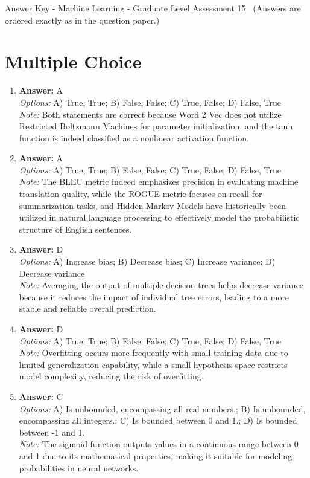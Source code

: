 \documentclass[12pt]{article}
\begin{document}
\begin{center}
Answer Key - Machine Learning - Graduate Level Assessment 15 \
\small (Answers are ordered exactly as in the question paper.)
\end{center}

\section*{Multiple Choice}
\begin{enumerate}[label=\arabic*.]
\item \textbf{Answer:} A
\\ \textit{Options:} A) True, True; B) False, False; C) True, False; D) False, True
\\ \textit{Note:} Both statements are correct because Word 2 Vec does not utilize Restricted Boltzmann Machines for parameter initialization, and the tanh function is indeed classified as a nonlinear activation function.
\item \textbf{Answer:} A
\\ \textit{Options:} A) True, True; B) False, False; C) True, False; D) False, True
\\ \textit{Note:} The BLEU metric indeed emphasizes precision in evaluating machine translation quality, while the ROGUE metric focuses on recall for summarization tasks, and Hidden Markov Models have historically been utilized in natural language processing to effectively model the probabilistic structure of English sentences.
\item \textbf{Answer:} D
\\ \textit{Options:} A) Increase bias; B) Decrease bias; C) Increase variance; D) Decrease variance
\\ \textit{Note:} Averaging the output of multiple decision trees helps decrease variance because it reduces the impact of individual tree errors, leading to a more stable and reliable overall prediction.
\item \textbf{Answer:} D
\\ \textit{Options:} A) True, True; B) False, False; C) True, False; D) False, True
\\ \textit{Note:} Overfitting occurs more frequently with small training data due to limited generalization capability, while a small hypothesis space restricts model complexity, reducing the risk of overfitting.
\item \textbf{Answer:} C
\\ \textit{Options:} A) Is unbounded, encompassing all real numbers.; B) Is unbounded, encompassing all integers.; C) Is bounded between 0 and 1.; D) Is bounded between -1 and 1.
\\ \textit{Note:} The sigmoid function outputs values in a continuous range between 0 and 1 due to its mathematical properties, making it suitable for modeling probabilities in neural networks.
\end{enumerate}
\end{document}
